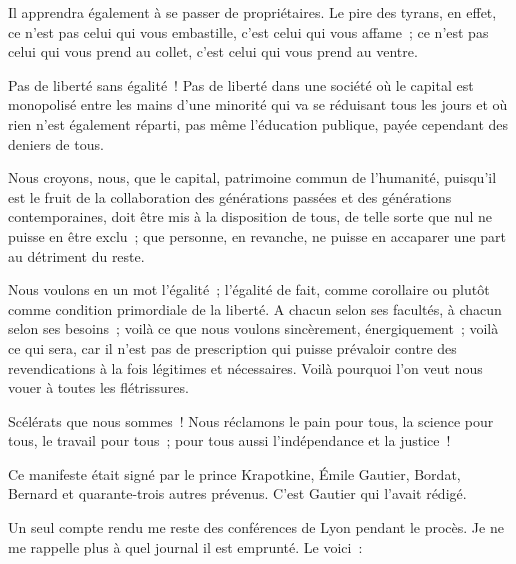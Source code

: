 \documentclass[french,twoside]{book} %
\newenvironment{quoteblock}%
  {\begin{quoting}}
  {\end{quoting}}
\newenvironment{quotebar}{%
    \def\FrameCommand{{\color{rubric!10!}\vrule width 0.5em} \hspace{0.9em}}%
    \def\OuterFrameSep{\itemsep} %
    \MakeFramed {\advance\hsize-\width \FrameRestore}
  }%
  {%
    \endMakeFramed
  }
\renewenvironment{quoteblock}%
  {%
    \savenotes
    \setstretch{0.9}
    \normalfont
    \begin{quotebar}
  }
  {%
    \end{quotebar}
    \spewnotes
  }
\begin{document}
\begin{quoteblock}
 Il apprendra également à se passer de propriétaires. Le pire des tyrans, en effet, ce n’est pas celui qui vous embastille, c’est celui qui vous affame ; ce n’est pas celui qui vous prend au collet, c’est celui qui vous prend au ventre.\par
 Pas de liberté sans égalité ! Pas de liberté dans une société où le capital est monopolisé entre les mains d’une minorité qui va se réduisant tous les jours et où rien n’est également réparti, pas même l’éducation publique, payée cependant des deniers de tous.\par
   Nous croyons, nous, que le capital, patrimoine commun de l’humanité, puisqu’il est le fruit de la collaboration des générations passées et des générations contemporaines, doit être mis à la disposition de tous, de telle sorte que nul ne puisse en être exclu ; que personne, en revanche, ne puisse en accaparer une part au détriment du reste.\par
 Nous voulons en un mot l’égalité ; l’égalité de fait, comme corollaire ou plutôt comme condition primordiale de la liberté. A chacun selon ses facultés, à chacun selon ses besoins ; voilà ce que nous voulons sincèrement, énergiquement ; voilà ce qui sera, car il n’est pas de prescription qui puisse prévaloir contre des revendications à la fois légitimes et nécessaires. Voilà pourquoi l’on veut nous vouer à toutes les flétrissures.\par
 Scélérats que nous sommes ! Nous réclamons le pain pour tous, la science pour tous, le travail pour tous ; pour tous aussi l’indépendance et la justice !
 \end{quoteblock}

\noindent Ce manifeste était signé par le prince Krapotkine, Émile Gautier, Bordat, Bernard et quarante-trois autres prévenus. C’est Gautier qui l’avait rédigé.\par
Un seul compte rendu me reste des conférences de Lyon pendant le procès. Je ne me rappelle plus à quel journal il est emprunté. Le voici :\par
\end{document}
